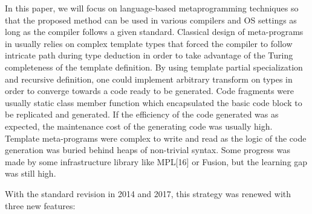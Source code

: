 \documentclass[../../main.tex]{subfiles}
\begin{document}
In this paper, we will focus on language-based metaprogramming
techniques so that the proposed method can
be used in various compilers and OS settings as long as the
compiler follows a given standard.
Classical design of meta-programs in \cpp usually relies
on complex template types that forced the compiler to follow
intricate path during type deduction in order to take advantage
of the Turing completeness of the template definition. By
using template partial specialization and recursive definition,
one could implement arbitrary transform on types in order
to converge towards a code ready to be generated. Code
fragments were usually static class member function which
encapsulated the basic code block to be replicated and
generated. If the efficiency of the code generated was as
expected, the maintenance cost of the generating code was
usually high. Template meta-programs were complex to write
and read as the logic of the code generation was buried
behind heaps of non-trivial syntax. Some progress was made
by some infrastructure library like MPL[16] or Fusion, but
the learning gap was still high.

With the standard \cpp revision in 2014 and 2017, this
strategy was renewed with three new \cpp features:
\end{document}
